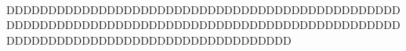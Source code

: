  DDDDDDDDDDDDDDDDDDDDDDDDDDDDDDDDDDDDDDDDDDDDDDDDDDDDDDDDDDDDDDDDDDDDDDDDDDDDDDDDDDDDDDDDDDDDDDDDDDDDDDDDDDDDDDDDDDDDDDDDDDDDDDDD